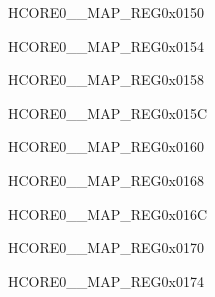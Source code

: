 \begin{register}{H}{CORE0\_\_MAP\_REG}{0x0150}\label{regdesc:CORE0FLASHMSPIINTMAPREG}
\end{register}\vspace{-3em}


\begin{register}{H}{CORE0\_\_MAP\_REG}{0x0154}\label{regdesc:CORE0CSIBRIDGEINTMAPREG}
\end{register}\vspace{-3em}


\begin{register}{H}{CORE0\_\_MAP\_REG}{0x0158}\label{regdesc:CORE0DSIBRIDGEINTMAPREG}
\end{register}\vspace{-3em}


\begin{register}{H}{CORE0\_\_MAP\_REG}{0x015C}\label{regdesc:CORE0CSIINTMAPREG}
\end{register}\vspace{-3em}


\begin{register}{H}{CORE0\_\_MAP\_REG}{0x0160}\label{regdesc:CORE0DSIINTMAPREG}
\end{register}\vspace{-3em}


\begin{register}{H}{CORE0\_\_MAP\_REG}{0x0168}\label{regdesc:CORE0LPIINTMAPREG}
\end{register}\vspace{-3em}


\begin{register}{H}{CORE0\_\_MAP\_REG}{0x016C}\label{regdesc:CORE0PMTINTMAPREG}
\end{register}\vspace{-3em}


\begin{register}{H}{CORE0\_\_MAP\_REG}{0x0170}\label{regdesc:CORE0SBDINTMAPREG}
\end{register}\vspace{-3em}


\begin{register}{H}{CORE0\_\_MAP\_REG}{0x0174}\label{regdesc:CORE0USBOTGINTMAPREG}
\end{register}\vspace{-3em}


